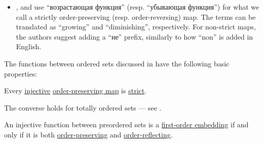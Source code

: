 \begin{remark}
\begin{itemize}
    \item {},  and  use \enquote{возрастающая функция} (resp. \enquote{убывающая функция}) for what we call a strictly order-preserving (resp. order-reversing) map. The terms can be translated as \enquote{growing} and \enquote{diminishing}, respectively. For non-strict maps, the authors suggest adding a \enquote{не} prefix, similarly to how \enquote{non} is added in English.
  \end{itemize}
\end{remark}

\begin{proposition}\label{thm:def:order_function}
  The functions between ordered sets discussed in  have the following basic properties:
  \begin{thmenum}
     Every \hyperref[def:function_invertibility/injective]{injective} \hyperref[def:order_function/preserving]{order-preserving map} is \hyperref[def:order_function/preserving]{strict}.

    The converse holds for totally ordered sets --- see .

     An injective function between preordered sets is a \hyperref[def:first_order_embedding]{first-order embedding} if and only if it is both \hyperref[def:order_function/preserving]{order-preserving} and \hyperref[def:order_function/preserving]{order-reflecting}.
  \end{thmenum}
\end{proposition}
